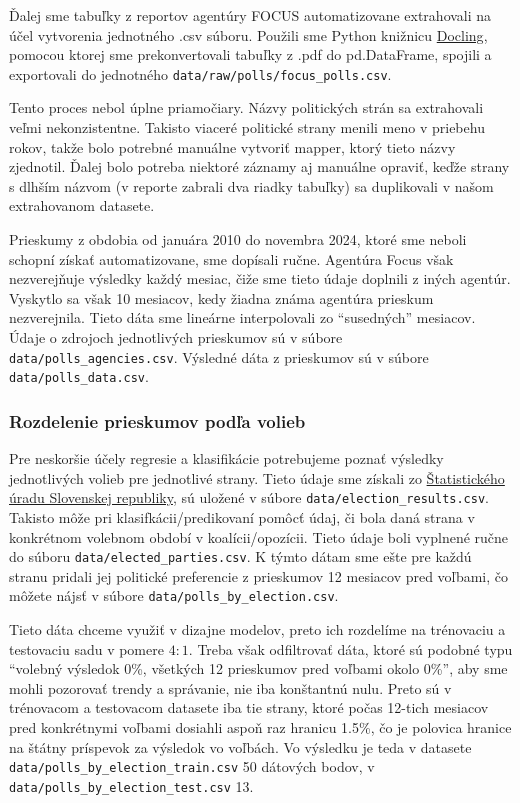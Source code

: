 \documentclass[main.tex]{subfiles}
\begin{document}
Ďalej sme tabuľky z reportov agentúry FOCUS automatizovane extrahovali na účel vytvorenia jednotného .csv súboru. Použili sme Python knižnicu \href{https://github.com/DS4SD/docling}{Docling}, pomocou ktorej sme prekonvertovali tabuľky z .pdf do pd.DataFrame, spojili a exportovali do jednotného \verb*|data/raw/polls/focus_polls.csv|.

Tento proces nebol úplne priamočiary. Názvy politických strán sa extrahovali veľmi nekonzistentne.
Takisto viaceré politické strany menili meno v priebehu rokov, takže bolo potrebné manuálne vytvoriť mapper, ktorý tieto názvy zjednotil. Ďalej bolo potreba niektoré záznamy aj manuálne opraviť, keďže strany s dlhším názvom (v reporte zabrali dva riadky tabuľky) sa duplikovali v našom extrahovanom datasete.

Prieskumy z obdobia od januára 2010 do novembra 2024, ktoré sme neboli schopní získať automatizovane, sme dopísali ručne. Agentúra Focus však nezverejňuje výsledky každý mesiac, čiže sme tieto údaje doplnili z iných agentúr. Vyskytlo sa však 10 mesiacov, kedy žiadna známa agentúra prieskum nezverejnila. Tieto dáta sme lineárne interpolovali zo \enquote{susedných} mesiacov. Údaje o zdrojoch jednotlivých prieskumov sú v súbore \verb*|data/polls_agencies.csv|. Výsledné dáta z prieskumov sú v súbore \verb*|data/polls_data.csv|.

\subsubsection*{Rozdelenie prieskumov podľa volieb}

Pre neskoršie účely regresie a klasifikácie potrebujeme poznať výsledky jednotlivých volieb pre jednotlivé strany. Tieto údaje sme získali zo \href{https://volby.statistics.sk/}{Štatistického úradu Slovenskej republiky}, sú uložené v súbore \verb*|data/election_results.csv|. Takisto môže pri klasifkácii/predikovaní pomôcť údaj, či bola daná strana v konkrétnom volebnom období v koalícii/opozícii. Tieto údaje boli vyplnené ručne do súboru \verb*|data/elected_parties.csv|. K týmto dátam sme ešte pre každú stranu pridali jej politické preferencie z prieskumov 12 mesiacov pred voľbami, čo môžete nájsť v súbore \verb*|data/polls_by_election.csv|.

Tieto dáta chceme využiť v dizajne modelov, preto ich rozdelíme na trénovaciu a testovaciu sadu v pomere $4:1$. Treba však odfiltrovať dáta, ktoré sú podobné typu \enquote{volebný výsledok 0\%, všetkých 12 prieskumov pred voľbami okolo 0\%}, aby sme mohli pozorovať trendy a správanie, nie iba konštantnú nulu. Preto sú v trénovacom a testovacom datasete iba tie strany, ktoré počas 12-tich mesiacov pred konkrétnymi voľbami dosiahli aspoň raz hranicu 1.5\%, čo je polovica hranice na štátny príspevok za výsledok vo voľbách. Vo výsledku je teda v datasete \verb*|data/polls_by_election_train.csv| 50 dátových bodov, v \verb*|data/polls_by_election_test.csv| 13.
\end{document}

